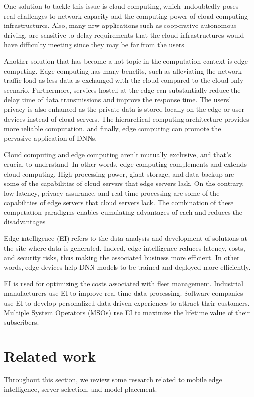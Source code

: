 \documentclass[lettersize,journal]{IEEEtran}
\begin{document}
One solution to tackle this issue is cloud computing, which undoubtedly poses real challenges to network capacity and the computing power of cloud computing infrastructures. Also, many new applications such as cooperative autonomous driving, are sensitive to delay requirements that the cloud infrastructures would have difficulty meeting since they may be far from the users. 

Another solution that has become a hot topic in the computation context is edge computing. Edge computing has many benefits, such as alleviating the network traffic load as less data is exchanged with the cloud compared to the cloud-only scenario. Furthermore, services hosted at the edge can substantially reduce the delay time of data transmissions and improve the response time. The users' privacy is also enhanced as the private data is stored locally on the edge or user devices instead of cloud servers. The hierarchical computing architecture provides more reliable computation, and finally, edge computing can promote the pervasive application of DNNs.
 
Cloud computing and edge computing aren't mutually exclusive, and that's crucial to understand. In other words, edge computing complements and extends cloud computing. High processing power, giant storage, and data backup are some of the capabilities of cloud servers that edge servers lack. On the contrary, low latency, privacy assurance, and real-time processing are some of the capabilities of edge servers that cloud servers lack. The combination of these computation paradigms enables cumulating advantages of each and reduces the disadvantages.
 
Edge intelligence (EI) refers to the data analysis and development of solutions at the site where data is generated. Indeed, edge intelligence reduces latency, costs, and security risks, thus making the associated business more efficient. In other words, edge devices help DNN models to be trained and deployed more efficiently. 

EI is used for optimizing the costs associated with fleet management. Industrial manufacturers use EI to improve real-time data processing. Software companies use EI to develop personalized data-driven experiences to attract their customers. Multiple System Operators (MSOs) use EI to maximize the lifetime value of their subscribers.

\section{Related work}
Throughout this section, we review some research related to mobile edge intelligence, server selection, and model placement.
\end{document}

